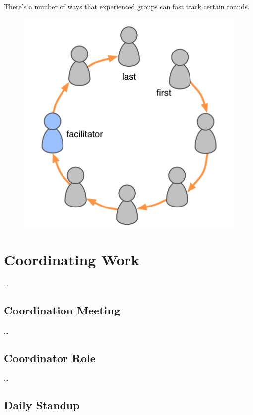 There's a number of ways that experienced groups can fast track certain rounds.

\begin{figure}[htbp]
\centering
\includegraphics[keepaspectratio,width=\textwidth,height=0.75\textheight]{img/circle/rounds.png}
\end{figure}

\chapter{Coordinating Work}
\label{coordinatingwork}

{\ldots}

\section{Coordination Meeting}
\label{coordinationmeeting}

{\ldots}

\section{Coordinator Role}
\label{coordinatorrole}

{\ldots}

\section{Daily Standup}
\label{dailystandup}

